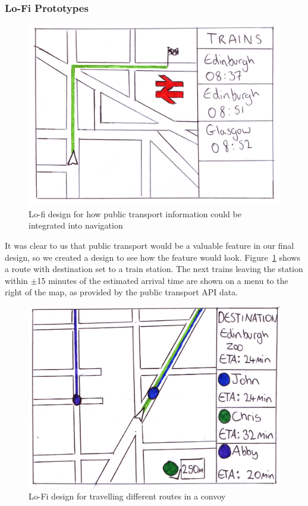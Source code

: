 \documentclass{article}
\begin{document}
\subsubsection{Lo-Fi Prototypes}
\begin{figure}[H]
	\centering
    \includegraphics[scale=0.5]{train-widget}
    \caption{Lo-fi design for how public transport information could be integrated into navigation}\label{train-widget}
\end{figure}

It was clear to us that public transport would be a valuable feature in our final design, so we created a design to see how the feature would look. Figure~\ref{train-widget} shows a route with destination set to a train station. The next trains leaving the station within $\pm$15 minutes of the estimated arrival time are shown on a menu to the right of the map, as provided by the public transport API data.
\begin{figure}[H]
  \centering
  \includegraphics[scale=0.5]{convoy-lofi}
  \caption{Lo-Fi design for travelling different routes in a convoy}\label{convoy-lofi}
\end{figure}
\end{document}
